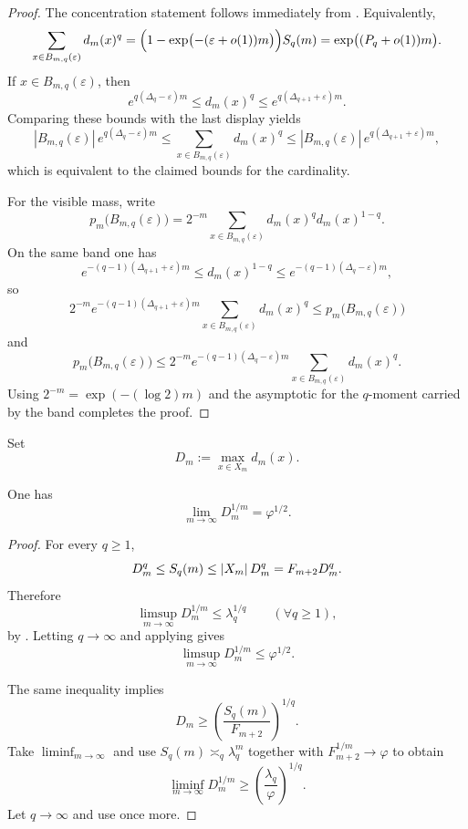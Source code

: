 \begin{proof}
The concentration statement follows immediately from
.  Equivalently,
\[
  \sum_{x\in B_{m,q}(\varepsilon)} d_m(x)^q
  =
  \Bigl(1-\exp\bigl(-(\varepsilon+o(1))m\bigr)\Bigr)S_q(m)
  =
  \exp\bigl((P_q+o(1))m\bigr).
\]
If \(x\in B_{m,q}(\varepsilon)\), then
\[
  e^{q(\Delta_q-\varepsilon)m}\le d_m(x)^q\le e^{q(\Delta_{q+1}+\varepsilon)m}.
\]
Comparing these bounds with the last display yields
\[
  |B_{m,q}(\varepsilon)|\,e^{q(\Delta_q-\varepsilon)m}
  \le
  \sum_{x\in B_{m,q}(\varepsilon)} d_m(x)^q
  \le
  |B_{m,q}(\varepsilon)|\,e^{q(\Delta_{q+1}+\varepsilon)m},
\]
which is equivalent to the claimed bounds for the cardinality.

For the visible mass, write
\[
  p_m\bigl(B_{m,q}(\varepsilon)\bigr)
  =
  2^{-m}\sum_{x\in B_{m,q}(\varepsilon)} d_m(x)^q d_m(x)^{1-q}.
\]
On the same band one has
\[
  e^{-(q-1)(\Delta_{q+1}+\varepsilon)m}
  \le
  d_m(x)^{1-q}
  \le
  e^{-(q-1)(\Delta_q-\varepsilon)m},
\]
so
\[
  2^{-m}e^{-(q-1)(\Delta_{q+1}+\varepsilon)m}
  \sum_{x\in B_{m,q}(\varepsilon)} d_m(x)^q
  \le
  p_m\bigl(B_{m,q}(\varepsilon)\bigr)
\]
and
\[
  p_m\bigl(B_{m,q}(\varepsilon)\bigr)
  \le
  2^{-m}e^{-(q-1)(\Delta_q-\varepsilon)m}
  \sum_{x\in B_{m,q}(\varepsilon)} d_m(x)^q.
\]
Using \(2^{-m}=\exp(-(\log 2)m)\) and the asymptotic for the
\(q\)-moment carried by the band completes the proof.
\end{proof}

\begin{definition}
\label{def:max-fiber}
Set
\[
  D_m:=\max_{x\in X_m} d_m(x).
\]
\end{definition}

\begin{theorem}
\label{thm:max-fiber}
One has
\[
  \lim_{m\to\infty} D_m^{1/m}=\varphi^{1/2}.
\]
\end{theorem}

\begin{proof}
For every \(q\ge 1\),
\[
  D_m^q\le S_q(m)\le \lvert X_m \rvert\,D_m^q=F_{m+2}D_m^q.
\]
Therefore
\[
  \limsup_{m\to\infty} D_m^{1/m}\le \lambda_q^{1/q}
  \qquad (\forall q\ge 1),
\]
by .  Letting \(q\to\infty\) and applying
 gives
\[
  \limsup_{m\to\infty} D_m^{1/m}\le \varphi^{1/2}.
\]

The same inequality implies
\[
  D_m\ge \left(\frac{S_q(m)}{F_{m+2}}\right)^{1/q}.
\]
Take \(\liminf_{m\to\infty}\) and use \(S_q(m)\asymp_q \lambda_q^m\) together
with \(F_{m+2}^{1/m}\to\varphi\) to obtain
\[
  \liminf_{m\to\infty} D_m^{1/m}\ge \left(\frac{\lambda_q}{\varphi}\right)^{1/q}.
\]
Let \(q\to\infty\) and use  once more.
\end{proof}

